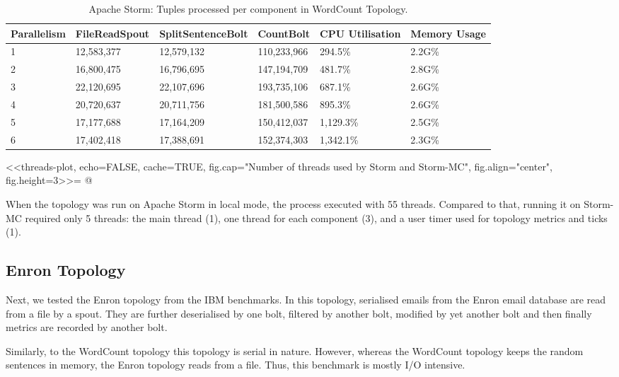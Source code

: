 \medskip
\begin{table}[!htb]
\begin{adjustwidth}{-0.5in}{-0.5in}
\centering
\small
\begin{tabular}{@{}llllll@{}}
    {Parallelism} & {FileReadSpout} & {SplitSentenceBolt} & {CountBolt} & {CPU Utilisation} & {Memory Usage} \\ \toprule
    1 & {12,583,377} & {12,579,132} & {110,233,966} & {294.5\%} & {2.2G\%} \\
    2 & {16,800,475} & {16,796,695} & {147,194,709} & {481.7\%} & {2.8G\%} \\
    3 & {22,120,695} & {22,107,696} & {193,735,106} & {687.1\%} & {2.6G\%} \\
    4 & {20,720,637} & {20,711,756} & {181,500,586} & {895.3\%} & {2.6G\%} \\
	5 & {17,177,688} & {17,164,209} & {150,412,037} & {1,129.3\%} & {2.5G\%} \\
	6 & {17,402,418} & {17,388,691} & {152,374,303} & {1,342.1\%} & {2.3G\%} \\
\end{tabular}
\caption{Apache Storm: Tuples processed per component in WordCount Topology.}
\end{adjustwidth}
\label{table:storm_wordcount}
\end{table}
\medskip

<<threads-plot, echo=FALSE, cache=TRUE, fig.cap="Number of threads used by Storm and Storm-MC", fig.align="center", fig.height=3>>=
@


When the topology was run on Apache Storm in local mode, the process executed with 55 threads. Compared to that, running it on Storm-MC required only 5 threads: the main thread (1), one thread for each component (3), and a user timer used for topology metrics and ticks (1).

\subsection{Enron Topology}

Next, we tested the Enron topology from the IBM benchmarks. In this topology, serialised emails from the Enron email database are read from a file by a spout. They are further deserialised by one bolt, filtered by another bolt, modified by yet another bolt and then finally metrics are recorded by another bolt.

Similarly, to the WordCount topology this topology is serial in nature. However, whereas the WordCount topology keeps the random sentences in memory, the Enron topology reads from a file. Thus, this benchmark is mostly I/O intensive.

